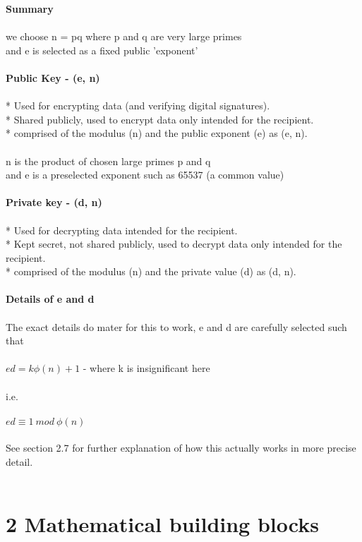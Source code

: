 \documentclass[11pt]{article}   	%
\begin{document}
\textbf{Summary} \\
\\
we choose n = pq where p and q are very large primes \\
and e is selected as a fixed public 'exponent' \\
\\
\textbf{Public Key - (e, n)} \\
\\
    * Used for encrypting data (and verifying digital signatures). \\
    * Shared publicly, used to encrypt data only intended for the recipient. \\
    * comprised of the modulus (n) and the public exponent (e) as (e, n). \\
\\
n is the product of chosen large primes p and q \\
and e is a preselected exponent such as 65537 (a common value) \\
\\
\textbf{Private key - (d, n)} \\
\\
    * Used for decrypting data intended for the recipient. \\
    * Kept secret, not shared publicly, used to decrypt data only intended for the recipient. \\
    * comprised of the modulus (n) and the private value (d) as (d, n). \\
\\
\textbf{Details of e and d} \\
\\
The exact details do mater for this to work, e and d are carefully selected such that \\
\\
$ ed = k\phi(n) + 1 $ - where k is insignificant here \\
\\
i.e. \\
\\
$ ed \equiv 1 \  mod \ \phi(n) $ \\
\\
See section 2.7 for further explanation of how this actually works in more precise detail. \\
\\

\break 


\section*{2 Mathematical building blocks}
\end{document}
